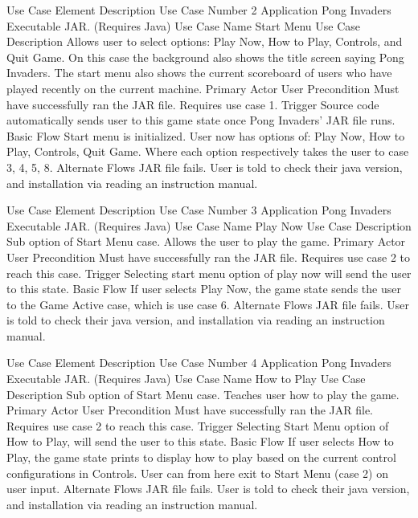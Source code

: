 \documentclass[12pt, titlepage]{article}
\begin{document}
Use Case Element
Description
Use Case Number
2
Application
Pong Invaders Executable JAR. (Requires Java)
Use Case Name
Start Menu
Use Case Description
Allows user to select options: Play Now, How to Play, Controls, and Quit Game. On this case the background also shows the title screen saying Pong Invaders. The start menu also shows the current scoreboard of users who have played recently on the current machine.
Primary Actor
User 
Precondition
Must have successfully ran the JAR file. Requires use case 1.
Trigger
Source code automatically sends user to this game state once Pong Invaders’ JAR file runs.
Basic Flow
Start menu is initialized. User now has options of: Play Now, How to Play, Controls, Quit Game. Where each option respectively takes the user to case 3, 4, 5, 8.
Alternate Flows
JAR file fails. User is told to check their java version, and installation via reading an instruction manual.










Use Case Element
Description
Use Case Number
3
Application
Pong Invaders Executable JAR. (Requires Java)
Use Case Name
Play Now
Use Case Description
Sub option of Start Menu case. Allows the user to play the game.
Primary Actor
User 
Precondition
Must have successfully ran the JAR file. Requires use case 2 to reach this case.
Trigger
Selecting start menu option of play now will send the user to this state.
Basic Flow
If user selects Play Now, the game state sends the user to the Game Active case, which is use case 6.
Alternate Flows
JAR file fails. User is told to check their java version, and installation via reading an instruction manual.





Use Case Element
Description
Use Case Number
4
Application
Pong Invaders Executable JAR. (Requires Java)
Use Case Name
How to Play
Use Case Description
Sub option of Start Menu case. Teaches user how to play the game.
Primary Actor
User 
Precondition
Must have successfully ran the JAR file. Requires use case 2 to reach this case.
Trigger
Selecting Start Menu option of How to Play, will send the user to this state.
Basic Flow
If user selects How to Play, the game state prints to display how to play based on the current control configurations in Controls. User can from here exit to Start Menu (case 2) on user input.
Alternate Flows
JAR file fails. User is told to check their java version, and installation via reading an instruction manual.
\end{document}

